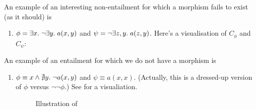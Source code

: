 \begin{enumerate}
  \begin{center}
    
  \end{center}
%
%
\end{enumerate}
%
An example of an interesting non-entailment for which a morphism fails to exist (as it should) is
%
\begin{enumerate}[resume]
\item{} $\phi=\exists x.\; \neg\exists y.\; a(x,y)$ and $\psi=\neg\exists z,y.\;  a(z,y)$. Here's a visualisation of $C_\phi$ and $C_\psi$:
  
  \begin{center}
    
  \end{center}
\end{enumerate}
%
An example of an entailment for which we do not have a morphism is
%
\begin{enumerate}[resume]
\item{} $\phi\equiv x\wedge \nexists y.\; \neg a(x,y)$ and $\psi\equiv a(x,x)$. (Actually, this is a dressed-up version of $\phi$ versus $\neg\neg\phi$.) See  for a visualiation.
  
  \begin{figure}
    \centering
%    
    \caption{Illustration of }
  \end{figure}
\end{enumerate}


